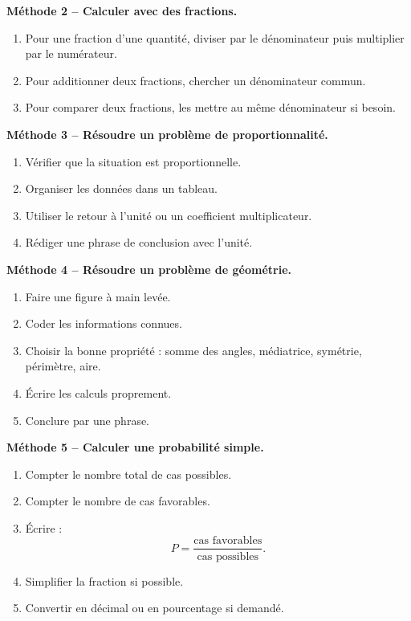 \documentclass[11pt,a4paper]{article}
\begin{document}
\begin{methodebox}
\textbf{Méthode 2 -- Calculer avec des fractions.}
\begin{enumerate}[label=\arabic*)]
\item Pour une fraction d'une quantité, diviser par le dénominateur puis multiplier par le numérateur.
\item Pour additionner deux fractions, chercher un dénominateur commun.
\item Pour comparer deux fractions, les mettre au même dénominateur si besoin.
\end{enumerate}
\end{methodebox}

\begin{methodebox}
\textbf{Méthode 3 -- Résoudre un problème de proportionnalité.}
\begin{enumerate}[label=\arabic*)]
\item Vérifier que la situation est proportionnelle.
\item Organiser les données dans un tableau.
\item Utiliser le retour à l'unité ou un coefficient multiplicateur.
\item Rédiger une phrase de conclusion avec l'unité.
\end{enumerate}
\end{methodebox}

\begin{methodebox}
\textbf{Méthode 4 -- Résoudre un problème de géométrie.}
\begin{enumerate}[label=\arabic*)]
\item Faire une figure à main levée.
\item Coder les informations connues.
\item Choisir la bonne propriété : somme des angles, médiatrice, symétrie, périmètre, aire.
\item Écrire les calculs proprement.
\item Conclure par une phrase.
\end{enumerate}
\end{methodebox}

\begin{methodebox}
\textbf{Méthode 5 -- Calculer une probabilité simple.}
\begin{enumerate}[label=\arabic*)]
\item Compter le nombre total de cas possibles.
\item Compter le nombre de cas favorables.
\item Écrire :
\[
P=\frac{\text{cas favorables}}{\text{cas possibles}}.
\]
\item Simplifier la fraction si possible.
\item Convertir en décimal ou en pourcentage si demandé.
\end{enumerate}
\end{methodebox}
\end{document}
